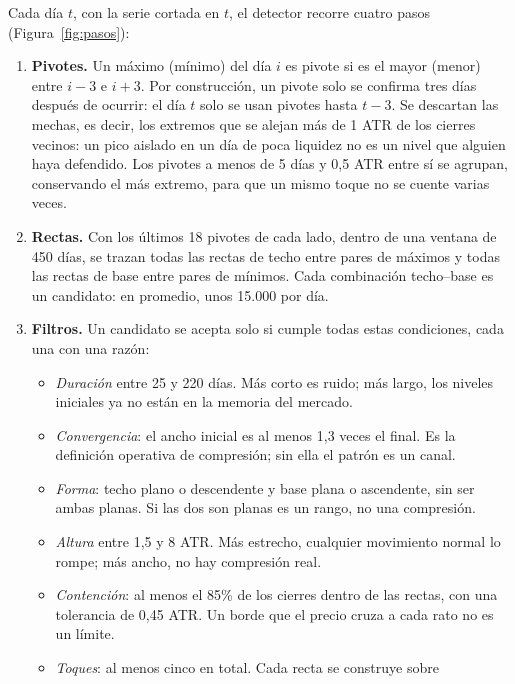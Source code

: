 \documentclass[10pt,a4paper]{article}
\begin{document}
Cada día $t$, con la serie cortada en $t$, el detector recorre cuatro pasos
(Figura~\ref{fig:pasos}):
\begin{enumerate}
  \item \textbf{Pivotes.} Un máximo (mínimo) del día $i$ es pivote si es el mayor
        (menor) entre $i-3$ e $i+3$. Por construcción, un pivote solo se confirma tres
        días después de ocurrir: el día $t$ solo se usan pivotes hasta $t-3$. Se
        descartan las mechas, es decir, los extremos que se alejan más de 1 ATR de los
        cierres vecinos: un pico aislado en un día de poca liquidez no es un nivel que
        alguien haya defendido. Los pivotes a menos de 5 días y 0,5 ATR entre sí se
        agrupan, conservando el más extremo, para que un mismo toque no se cuente
        varias veces.
  \item \textbf{Rectas.} Con los últimos 18 pivotes de cada lado, dentro de una ventana
        de 450 días, se trazan todas las rectas de techo entre pares de máximos y todas
        las rectas de base entre pares de mínimos. Cada combinación techo--base es un
        candidato: en promedio, unos 15.000 por día.
  \item \textbf{Filtros.} Un candidato se acepta solo si cumple todas estas
        condiciones, cada una con una razón:
        \begin{itemize}
          \item \emph{Duración} entre 25 y 220 días. Más corto es ruido; más largo,
                los niveles iniciales ya no están en la memoria del mercado.
          \item \emph{Convergencia}: el ancho inicial es al menos 1,3 veces el final.
                Es la definición operativa de compresión; sin ella el patrón es un
                canal.
          \item \emph{Forma}: techo plano o descendente y base plana o ascendente, sin
                ser ambas planas. Si las dos son planas es un rango, no una compresión.
          \item \emph{Altura} entre 1,5 y 8 ATR. Más estrecho, cualquier movimiento
                normal lo rompe; más ancho, no hay compresión real.
          \item \emph{Contención}: al menos el 85\% de los cierres dentro de las
                rectas, con una tolerancia de 0,45 ATR. Un borde que el precio cruza a
                cada rato no es un límite.
          \item \emph{Toques}: al menos cinco en total. Cada recta se construye sobre

\end{itemize}
\end{enumerate}
\end{document}
